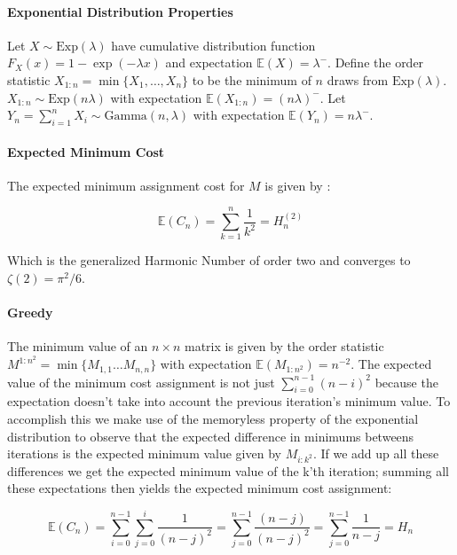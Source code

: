 \documentclass{article}
\newcommand{\set}[1]{\lbrace #1 \rbrace}
\newcommand{\expected}[1]{\mathbb{E} \left ( #1 \right )}
\newcommand{\exprv}[1]{\text{Exp} \left( #1 \right )}
\begin{document}
\paragraph{Exponential Distribution Properties}

Let $X \sim \exprv{\lambda}$ have cumulative distribution function $F_X(x) = 1 - \exp{\left(-\lambda x\right)}$ and expectation $\expected{X} = \lambda^{-}$. Define the order statistic $X_{1:n} = \min \lbrace X_{1}, \ldots, X_{n} \rbrace $ to be the minimum of $n$ draws from $\exprv{\lambda}$. $X_{1:n} \sim \exprv{n \lambda}$ \cite{balakrishnan2000handbook} with expectation $\expected{X_{1:n}} = \left(n \lambda\right)^-$. Let $Y_n = \sum_{i = 1}^{n} X_i \sim \text{Gamma}(n, \lambda)$ with expectation $\expected{Y_n} = n \lambda^{-}$.

\paragraph{Expected Minimum Cost}

The expected minimum assignment cost for $M$ is given by \cite{aldous2001zeta}:

\begin{equation}
	\expected{C_n} = \sum_{k = 1}^{n} \frac{1}{k^2} = H_{n}^{(2)}
\end{equation}

Which is the generalized Harmonic Number of order two and converges to $\zeta(2) = \pi^2/6$.

\paragraph{Greedy}

The minimum value of an $n \times n$ matrix is given by the order statistic $M^{1:n^2} = \min \set{ M_{1,1} \ldots M_{n, n} }$ with expectation $\expected{ M_{1:n^2} } = n^{-2}$. The expected value of the minimum cost assignment is not just $\sum_{i=0}^{n-1} (n-i)^2$ because the expectation doesn't take into account the previous iteration's minimum value. To accomplish this we make use of the memoryless property of the exponential distribution to observe that the expected difference in minimums betweens iterations is the expected minimum value given by $M_{i:k^2}$. If we add up all these differences we get the expected minimum value of the k'th iteration; summing all these expectations then yields the expected minimum cost assignment:

\begin{equation}
	\expected{C_n} = \sum_{i=0}^{n-1} \sum_{j=0}^{i} \frac{1}{(n - j)^2} = \sum_{j=0}^{n-1} \frac{(n-j)}{(n-j)^2} = \sum_{j=0}^{n-1} \frac{1}{n-j} = H_n
\end{equation}
\end{document}
